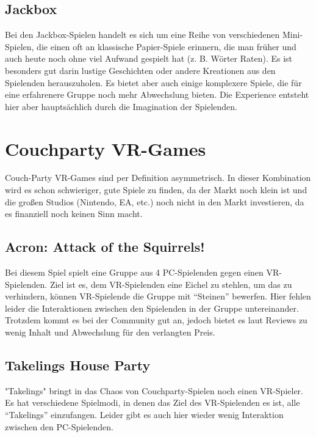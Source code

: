 \subsection{Jackbox}
Bei den Jackbox-Spielen handelt es sich um eine Reihe von verschiedenen Mini-Spielen, die einen oft an klassische Papier-Spiele erinnern, die man früher und auch heute noch ohne viel Aufwand gespielt hat (z. B. Wörter Raten). Es ist besonders gut darin lustige Geschichten oder andere Kreationen aus den Spielenden herauszuholen. Es bietet aber auch einige komplexere Spiele, die für eine erfahrenere Gruppe noch mehr Abwechslung bieten. Die Experience entsteht hier aber hauptsächlich durch die Imagination der Spielenden.

\section{Couchparty VR-Games}

Couch-Party VR-Games sind per Definition asymmetrisch. In dieser Kombination wird es schon schwieriger, gute Spiele zu finden, da der Markt noch klein ist und die großen Studios (Nintendo, EA, etc.) noch nicht in den Markt investieren, da es finanziell noch keinen Sinn macht.

\subsection{Acron: Attack of the Squirrels!}
Bei diesem Spiel spielt eine Gruppe aus 4 PC-Spielenden gegen einen VR-Spielenden. Ziel ist es, dem VR-Spielenden eine Eichel zu stehlen, um das zu verhindern, können VR-Spielende die Gruppe mit "`Steinen"' bewerfen. Hier fehlen leider die Interaktionen zwischen den Spielenden in der Gruppe untereinander. Trotzdem kommt es bei der Community gut an, jedoch bietet es laut Reviews zu wenig Inhalt und Abwechslung für den verlangten Preis\cite{_acron_reviews}.

\subsection{Takelings House Party}
"Takelings" bringt in das Chaos von Couchparty-Spielen noch einen VR-Spieler. Es hat verschiedene Spielmodi, in denen das Ziel des VR-Spielenden es ist, alle "`Takelings"' einzufangen. Leider gibt es auch hier wieder wenig Interaktion zwischen den PC-Spielenden.